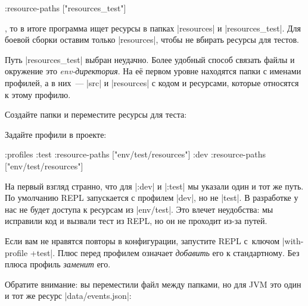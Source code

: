 \begin{english}
  \begin{clojure}
:resource-paths ["resources_test"]
  \end{clojure}
\end{english}

\noindent
, то в итоге программа ищет ресурсы в папках \spverb|resources| и
\spverb|resources_test|. Для боевой сборки оставим только \spverb|resources|,
чтобы не вбирать ресурсы для тестов.


Путь \spverb|resources_test| выбран неудачно. Более удобный способ связать файлы
и окружение это \emph{env-директория}. На е\"{е} первом уровне находятся папки с
именами профилей, а в них~--- \spverb|src| и \spverb|resources| с кодом и
ресурсами, которые относятся к этому профилю.

Создайте папки и переместите ресурсы для теста:

\begin{english}
\end{english}

\noindent
Задайте профили в проекте:

\begin{english}
  \begin{clojure}
:profiles {:test {:resource-paths ["env/test/resources"]}
           :dev  {:resource-paths ["env/test/resources"]}}
  \end{clojure}
\end{english}

На первый взгляд странно, что для \spverb|:dev| и \spverb|:test| мы указали один
и тот же путь. По умолчанию REPL запускается с профилем \spverb|dev|, но не
\spverb|test|. В разработке у нас не будет доступа к ресурсам из
\spverb|env/test|. Это влечет неудобства: мы исправили код и вызвали тест из
REPL, но он не проходит из-за путей.


Если вам не нравятся повторы в конфигурации, запустите REPL с~ключом
\spverb|with-profile +test|. Плюс перед профилем означает \emph{добавить} его к
стандартному. Без плюса профиль \emph{заменит} его.


Обратите внимание: вы переместили файл между папками, но для JVM это один и тот
же ресурс \spverb|data/events.json|:

